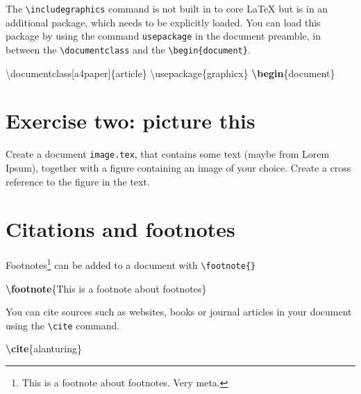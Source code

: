 \documentclass[
]{book}
\newenvironment{Shaded}{\begin{snugshade}}{\end{snugshade}}
\newcommand{\BuiltInTok}[1]{#1}
\newcommand{\ExtensionTok}[1]{#1}
\newcommand{\FunctionTok}[1]{\textcolor[rgb]{0.13,0.29,0.53}{\textbf{#1}}}
\newcommand{\KeywordTok}[1]{\textcolor[rgb]{0.13,0.29,0.53}{\textbf{#1}}}
\newcommand{\NormalTok}[1]{#1}
\begin{document}
The \texttt{\textbackslash{}includegraphics} command is not built in to core LaTeX but is in an additional package, which needs to be explicitly loaded. You can load this package by using the command \texttt{usepackage} in the document preamble, in between the \texttt{\textbackslash{}documentclass} and the \texttt{\textbackslash{}begin\{document\}}.

\begin{Shaded}
\begin{Highlighting}[]
\BuiltInTok{\textbackslash{}documentclass}\NormalTok{[a4paper]\{}\ExtensionTok{article}\NormalTok{\}}
\BuiltInTok{\textbackslash{}usepackage}\NormalTok{\{}\ExtensionTok{graphicx}\NormalTok{\}}
\KeywordTok{\textbackslash{}begin}\NormalTok{\{}\ExtensionTok{document}\NormalTok{\}}
\end{Highlighting}
\end{Shaded}

\section{Exercise two: picture this}\label{ex2}

Create a document \texttt{image.tex}, that contains some text (maybe from Lorem Ipsum), together with a figure containing an image of your choice. Create a cross reference to the figure in the text.

\section{Citations and footnotes}\label{citations-and-footnotes}

Footnotes\footnote{This is a footnote about footnotes. Very meta.} can be added to a document with \texttt{\textbackslash{}footnote\{\}}

\begin{Shaded}
\begin{Highlighting}[]
\FunctionTok{\textbackslash{}footnote}\NormalTok{\{This is a footnote about footnotes\}}
\end{Highlighting}
\end{Shaded}

You can cite sources such as websites, books or journal articles in your document using the \texttt{\textbackslash{}cite} command.

\begin{Shaded}
\begin{Highlighting}[]
\KeywordTok{\textbackslash{}cite}\NormalTok{\{}\ExtensionTok{alanturing}\NormalTok{\}}
\end{Highlighting}
\end{Shaded}
\end{document}
